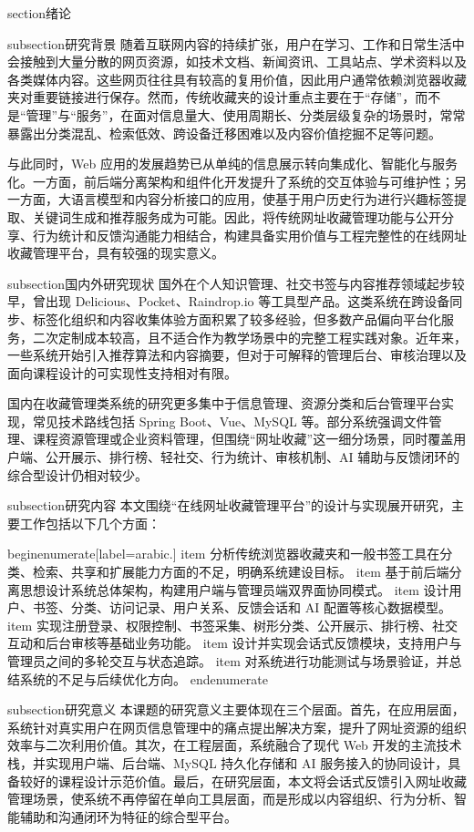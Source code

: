 section{绪论}

subsection{研究背景}
随着互联网内容的持续扩张，用户在学习、工作和日常生活中会接触到大量分散的网页资源，如技术文档、新闻资讯、工具站点、学术资料以及各类媒体内容。这些网页往往具有较高的复用价值，因此用户通常依赖浏览器收藏夹对重要链接进行保存。然而，传统收藏夹的设计重点主要在于“存储”，而不是“管理”与“服务”，在面对信息量大、使用周期长、分类层级复杂的场景时，常常暴露出分类混乱、检索低效、跨设备迁移困难以及内容价值挖掘不足等问题。

与此同时，Web 应用的发展趋势已从单纯的信息展示转向集成化、智能化与服务化。一方面，前后端分离架构和组件化开发提升了系统的交互体验与可维护性；另一方面，大语言模型和内容分析接口的应用，使基于用户历史行为进行兴趣标签提取、关键词生成和推荐服务成为可能。因此，将传统网址收藏管理功能与公开分享、行为统计和反馈沟通能力相结合，构建具备实用价值与工程完整性的在线网址收藏管理平台，具有较强的现实意义。

subsection{国内外研究现状}
国外在个人知识管理、社交书签与内容推荐领域起步较早，曾出现 Delicious、Pocket、Raindrop.io 等工具型产品。这类系统在跨设备同步、标签化组织和内容收集体验方面积累了较多经验，但多数产品偏向平台化服务，二次定制成本较高，且不适合作为教学场景中的完整工程实践对象。近年来，一些系统开始引入推荐算法和内容摘要，但对于可解释的管理后台、审核治理以及面向课程设计的可实现性支持相对有限。

国内在收藏管理类系统的研究更多集中于信息管理、资源分类和后台管理平台实现，常见技术路线包括 Spring Boot、Vue、MySQL 等。部分系统强调文件管理、课程资源管理或企业资料管理，但围绕“网址收藏”这一细分场景，同时覆盖用户端、公开展示、排行榜、轻社交、行为统计、审核机制、AI 辅助与反馈闭环的综合型设计仍相对较少。

subsection{研究内容}
本文围绕“在线网址收藏管理平台”的设计与实现展开研究，主要工作包括以下几个方面：

begin{enumerate}[label=arabic.]
    item 分析传统浏览器收藏夹和一般书签工具在分类、检索、共享和扩展能力方面的不足，明确系统建设目标。
    item 基于前后端分离思想设计系统总体架构，构建用户端与管理员端双界面协同模式。
    item 设计用户、书签、分类、访问记录、用户关系、反馈会话和 AI 配置等核心数据模型。
    item 实现注册登录、权限控制、书签采集、树形分类、公开展示、排行榜、社交互动和后台审核等基础业务功能。
    item 设计并实现会话式反馈模块，支持用户与管理员之间的多轮交互与状态追踪。
    item 对系统进行功能测试与场景验证，并总结系统的不足与后续优化方向。
end{enumerate}

subsection{研究意义}
本课题的研究意义主要体现在三个层面。首先，在应用层面，系统针对真实用户在网页信息管理中的痛点提出解决方案，提升了网址资源的组织效率与二次利用价值。其次，在工程层面，系统融合了现代 Web 开发的主流技术栈，并实现用户端、后台端、MySQL 持久化存储和 AI 服务接入的协同设计，具备较好的课程设计示范价值。最后，在研究层面，本文将会话式反馈引入网址收藏管理场景，使系统不再停留在单向工具层面，而是形成以内容组织、行为分析、智能辅助和沟通闭环为特征的综合型平台。


